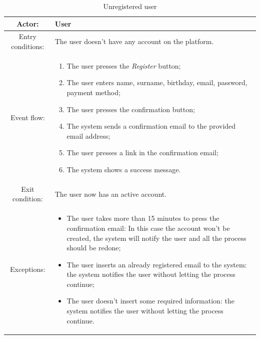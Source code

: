 \begin{table}[h]
    \begin{center}
        \begin{tabular}{|c||p{10cm}|}
            \hline
            Actor:            & User                                               \\
            \hline
            Entry conditions: & The user doesn't have any account on the platform. \\
            \hline
            Event flow:       &
            \begin{enumerate}
                \item The user presses the \textit{Register} button;
                \item The user enters name, surname, birthday, email, password, payment method;
                \item The user presses the confirmation button;
                \item The system sends a confirmation email to the provided email address;
                \item The user presses a link in the confirmation email;
                \item The system shows a success message.
            \end{enumerate}
            \\
            \hline
            Exit condition:   & The user now has an active account.                \\
            \hline
            Exceptions:       &
            \begin{itemize}
                \item The user takes more than 15 minutes to press the confirmation email: In this case the account won't be created, the system will notify the user and all the process should be redone;
                \item The user inserts an already registered email to the system: the system notifies the user without letting the process continue;
                \item The user doesn't insert some required information: the system notifies the user without letting the process continue.
            \end{itemize}
            \\
            \hline
        \end{tabular}
    \end{center}
    \caption{Unregistered user}
\end{table}

